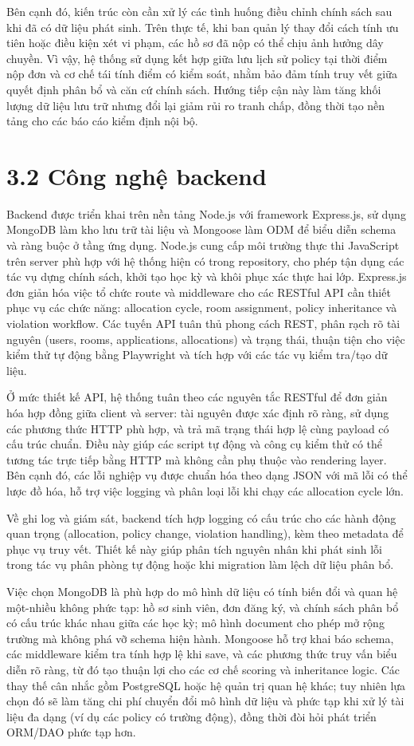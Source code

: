 Bên cạnh đó, kiến trúc còn cần xử lý các tình huống điều chỉnh chính sách sau khi đã có dữ liệu phát sinh. Trên thực tế, khi ban quản lý thay đổi cách tính ưu tiên hoặc điều kiện xét vi phạm, các hồ sơ đã nộp có thể chịu ảnh hưởng dây chuyền. Vì vậy, hệ thống sử dụng kết hợp giữa lưu lịch sử policy tại thời điểm nộp đơn và cơ chế tái tính điểm có kiểm soát, nhằm bảo đảm tính truy vết giữa quyết định phân bổ và căn cứ chính sách. Hướng tiếp cận này làm tăng khối lượng dữ liệu lưu trữ nhưng đổi lại giảm rủi ro tranh chấp, đồng thời tạo nền tảng cho các báo cáo kiểm định nội bộ.

\section*{3.2 Công nghệ backend}
Backend được triển khai trên nền tảng Node.js với framework Express.js, sử dụng MongoDB làm kho lưu trữ tài liệu và Mongoose làm ODM để biểu diễn schema và ràng buộc ở tầng ứng dụng. Node.js cung cấp môi trường thực thi JavaScript trên server phù hợp với hệ thống hiện có trong repository, cho phép tận dụng các tác vụ dựng chính sách, khởi tạo học kỳ và khôi phục xác thực hai lớp. Express.js đơn giản hóa việc tổ chức route và middleware cho các RESTful API cần thiết phục vụ các chức năng: allocation cycle, room assignment, policy inheritance và violation workflow. Các tuyến API tuân thủ phong cách REST, phân rạch rõ tài nguyên (users, rooms, applications, allocations) và trạng thái, thuận tiện cho việc kiểm thử tự động bằng Playwright và tích hợp với các tác vụ kiểm tra/tạo dữ liệu.

Ở mức thiết kế API, hệ thống tuân theo các nguyên tắc RESTful để đơn giản hóa hợp đồng giữa client và server: tài nguyên được xác định rõ ràng, sử dụng các phương thức HTTP phù hợp, và trả mã trạng thái hợp lệ cùng payload có cấu trúc chuẩn. Điều này giúp các script tự động và công cụ kiểm thử có thể tương tác trực tiếp bằng HTTP mà không cần phụ thuộc vào rendering layer. Bên cạnh đó, các lỗi nghiệp vụ được chuẩn hóa theo dạng JSON với mã lỗi có thể lược đồ hóa, hỗ trợ việc logging và phân loại lỗi khi chạy các allocation cycle lớn.

Về ghi log và giám sát, backend tích hợp logging có cấu trúc cho các hành động quan trọng (allocation, policy change, violation handling), kèm theo metadata để phục vụ truy vết. Thiết kế này giúp phân tích nguyên nhân khi phát sinh lỗi trong tác vụ phân phòng tự động hoặc khi migration làm lệch dữ liệu phân bổ.

Việc chọn MongoDB là phù hợp do mô hình dữ liệu có tính biến đổi và quan hệ một-nhiều không phức tạp: hồ sơ sinh viên, đơn đăng ký, và chính sách phân bổ có cấu trúc khác nhau giữa các học kỳ; mô hình document cho phép mở rộng trường mà không phá vỡ schema hiện hành. Mongoose hỗ trợ khai báo schema, các middleware kiểm tra tính hợp lệ khi save, và các phương thức truy vấn biểu diễn rõ ràng, từ đó tạo thuận lợi cho các cơ chế scoring và inheritance logic. Các thay thế cân nhắc gồm PostgreSQL hoặc hệ quản trị quan hệ khác; tuy nhiên lựa chọn đó sẽ làm tăng chi phí chuyển đổi mô hình dữ liệu và phức tạp khi xử lý tài liệu đa dạng (ví dụ các policy có trường động), đồng thời đòi hỏi phát triển ORM/DAO phức tạp hơn.

